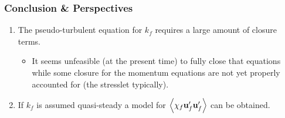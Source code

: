 \documentclass{sintefbeamer}
\begin{document}


\begin{frame}
  \frametitle{Conclusion \& Perspectives}

  \begin{enumerate}
    \item The pseudo-turbulent equation for $k_f$ requires a large amount of closure terms. 
    \begin{itemize}
      \item 
      It seems unfeasible (at the present time) to fully close that equations while some closure for the momentum equations are not yet properly accounted for (the stresslet typically). 
    \end{itemize}
    \item If $k_f$ is assumed quasi-steady a model for $\left<\chi_f\textbf{u}_f'\textbf{u}_f'\right>$ can be obtained. 
  \end{enumerate}

\end{frame}
\end{document}
